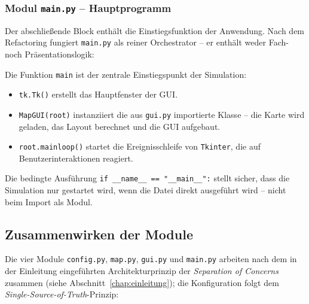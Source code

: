 
\subsubsection{Modul \texttt{main.py} – Hauptprogramm}

Der abschließende Block enthält die Einstiegsfunktion der Anwendung. Nach dem Refactoring fungiert \texttt{main.py} als reiner Orchestrator – er enthält weder Fach- noch Präsentationslogik:



Die Funktion \texttt{main} ist der zentrale Einstiegspunkt der Simulation:
\begin{itemize}
    \item \texttt{tk.Tk()} erstellt das Hauptfenster der \acs{GUI}.
    \item \texttt{MapGUI(root)} instanziiert die aus \texttt{gui.py} importierte Klasse – die Karte wird geladen, das Layout berechnet und die \acs{GUI} aufgebaut.
    \item \texttt{root.mainloop()} startet die Ereignisschleife von \texttt{Tkinter}, die auf Benutzerinteraktionen reagiert.
\end{itemize}

Die bedingte Ausführung \texttt{if \_\_name\_\_ == "\_\_main\_\_":} stellt sicher, dass die Simulation nur gestartet wird, wenn die Datei direkt ausgeführt wird – nicht beim Import als Modul.


\subsection{Zusammenwirken der Module}

Die vier Module \texttt{config.py}, \texttt{map.py}, \texttt{gui.py} und \texttt{main.py} arbeiten nach dem in der Einleitung eingeführten Architekturprinzip der \textit{Separation of Concerns} zusammen (siehe Abschnitt~\ref{chap:einleitung}); die Konfiguration folgt dem \textit{Single-Source-of-Truth}-Prinzip:

